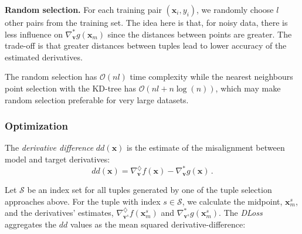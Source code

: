 \documentclass{article}
\newcommand{\kibitz}[2]{\ifnum\Comments=1\textcolor{#1}{#2}\fi}
\newcommand{\kizito}[1]{\kibitz{red} {[Kizito: #1]}}
\newcommand{\enrico}[1]{\kibitz{blue} {[Enrico: #1]}}
\newcommand{\tillman}[1]{\kibitz{darkgreen} {[Tillman: #1]}}
\begin{document}
\textbf{Random selection. } 
For each training pair $(\mathbf{x}_i, y_i)$, we randomly choose $l$ other pairs from the training set. 
The idea here is that, for noisy data, there is less influence on $\nabla_\textbf{v}^* g(\mathbf{x}_m)$ since the distances between points are greater. 
The trade-off is that greater distances between tuples lead to lower accuracy of the estimated derivatives.

The random selection has $\mathcal{O}(nl)$ time complexity while the nearest neighbours point selection with the KD-tree has $\mathcal{O}(nl + n \log(n))$, which may make random selection preferable for very large datasets.%

\subsubsection{Optimization}
\label{subsec_optimization}
The \emph{derivative difference} $dd(\mathbf{x})$ is the estimate of the misalignment between model and target derivatives: 
\begin{equation}
  dd(\mathbf{x}) = \nabla^{\diamondsuit}_{\mathbf{v}}f(\mathbf{x}) - \nabla^{*}_{\mathbf{v}}g(\mathbf{x})\,.
\end{equation}

Let $\mathcal S$ be an index set for all tuples generated by one of the tuple selection approaches above. For the tuple with index $s\in\mathcal S$, we calculate the midpoint, $\mathbf{x}_m^{s}$, and the derivatives' estimates, $\nabla^{\diamondsuit}_{\mathbf{v}^s}f(\mathbf{x}_m^{s})$ and $\nabla^{*}_{\mathbf{v}^s}g(\mathbf{x}_m^{s})$. 
The \emph{DLoss} aggregates the $dd$ values as the mean squared derivative-difference:%
\end{document}
